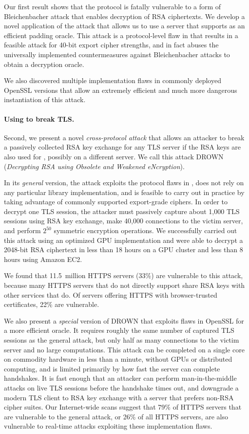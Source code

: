 Our first result shows that the \ssltwo protocol is fatally vulnerable to a
form of Bleichenbacher attack that enables decryption of RSA ciphertexts. We
develop a novel application of the attack that allows us to use a server that
supports \ssltwo as an efficient padding oracle. This attack is a
protocol-level flaw in \ssltwo that results in a feasible attack for 40-bit
export cipher strengths, and in fact abuses the universally implemented
countermeasures against Bleichenbacher attacks to obtain a decryption oracle.

We also discovered multiple implementation flaws in commonly deployed OpenSSL
versions that allow an extremely efficient and much more dangerous
instantiation of this attack.

\paragraph{Using \ssltwo to break TLS\@.}
Second, we present a novel \textit{cross-protocol attack} that allows an
attacker to break a passively collected RSA key exchange for any TLS server
if the RSA keys are also used for \ssltwo, possibly on a different server. We
call this attack DROWN (\emph{Decrypting RSA using Obsolete and Weakened
eNcryption}).

In its \emph{general} version, the attack exploits the protocol flaws in
\ssltwo, does not rely on any particular library implementation, and is
feasible to carry out in practice by taking advantage of commonly supported
export-grade ciphers. In order to decrypt one TLS session, the attacker must
passively capture about 1,000 TLS sessions using RSA key exchange, make
40,000 \ssltwo connections to the victim server, and perform $2^{50}$
symmetric encryption operations. We successfully carried out this attack
using an optimized GPU implementation and were able to decrypt a 2048-bit RSA
ciphertext in less than 18 hours on a GPU cluster and less than 8 hours using
Amazon EC2.

We found that 11.5~million HTTPS servers (33\%) are vulnerable to this
attack, because many HTTPS servers that do not directly support \ssltwo share
RSA keys with other services that do. Of servers offering HTTPS with
browser-trusted certificates, 22\% are vulnerable.

We also present a \emph{special} version of DROWN that exploits flaws in
OpenSSL for a more efficient oracle. It requires roughly the same number of
captured TLS sessions as the general attack, but only half as many
connections to the victim server and no large computations. This attack can
be completed on a single core on commodity hardware in less than a minute,
\ifext without GPUs or distributed computing, \fi and is limited primarily by
how fast the server can complete handshakes. It is fast enough that an
attacker can perform man-in-the-middle attacks on live TLS sessions before
the handshake times out, and {downgrade} a modern TLS client to RSA key
exchange with a server that prefers non-RSA cipher suites. Our Internet-wide
scans suggest that 79\% of HTTPS servers that are vulnerable to the general
attack, or 26\% of all HTTPS servers, are also vulnerable to real-time
attacks exploiting these implementation flaws.

